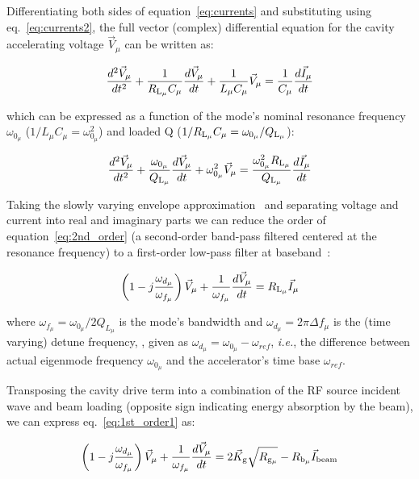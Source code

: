 \documentclass[a4paper,12pt]{article}
\begin{document}
Differentiating both sides of equation~\ref{eq:currents} and substituting using eq.~\ref{eq:currents2}, the full vector (complex) differential equation for the cavity accelerating voltage $\vec V_{\mu}$ can be written as:

\begin{equation}
  \frac{d^2\vec V_{\mu}}{dt^2} + \frac{1}{R_{\rm L_{\mu}}C_{\mu}}\frac{d\vec V_{\mu}}{dt} + \frac{1}{L_{\mu}C_{\mu}}\vec V_{\mu} = \frac{1}{C_{\mu}}\frac{d\vec I_{\mu}}{dt}
\end{equation}

\noindent which can be expressed as a function of the mode's nominal resonance frequency $\omega_{0_{\mu}}$ ($1/L_{\mu}C_{\mu}=\omega_{0_{\mu}}^2$) and loaded Q ($1/R_{\rm L_{\mu}}C_{\mu}=\omega_{0_{\mu}}/Q_{\rm L_{\mu}}$):
 
\begin{equation}
  \frac{d^2\vec V_{\mu}}{dt^2} + \frac{\omega_{0_{\mu}}}{Q_{\rm L_{\mu}}}\frac{d\vec V_{\mu}}{dt} + \omega_{0_{\mu}}^2 \vec V_{\mu} = \frac{\omega_{0_{\mu}}^2 R_{\rm L_{\mu}}}{Q_{\rm L_{\mu}}}\frac{d\vec I_{\mu}}{dt}
  \label{eq:2nd_order}
\end{equation}

Taking the slowly varying envelope approximation~\cite{ref:svea} and separating voltage and current into real and imaginary parts we can reduce the order of equation~\ref{eq:2nd_order} (a second-order band-pass filtered centered at the resonance frequency) to a first-order low-pass filter at baseband~\cite{ref:schilcher}:

\begin{equation}
  \left(1-j\frac{\omega_{d_{\mu}}}{\omega_{f_{\mu}}}\right)\vec V_{\mu} + \frac{1}{\omega_{f_{\mu}}}\frac{d\vec V_{\mu}}{dt} = R_{\rm L_{\mu}} \vec I_{\mu}
  \label{eq:1st_order1}
\end{equation}

\noindent where $\omega_{f_{\mu}}=\omega_{0_{\mu}}/2Q_{L_{\mu}}$ is the mode's bandwidth and $\omega_{d_{\mu}}=2\pi\Delta f_{\mu}$ is the (time varying) detune frequency,  , given as $\omega_{d_{\mu}}=\omega_{0_{\mu}}-\omega_{ref}$, {\it i.e.}, the difference between actual eigenmode frequency $\omega_{0_{\mu}}$ and the accelerator's time base $\omega_{ref}$.

Transposing the cavity drive term into a combination of the RF source incident wave and beam loading (opposite sign indicating energy absorption by the beam), we can express eq.~\ref{eq:1st_order1} as:

\begin{equation}
  \left(1-j\frac{\omega_{d_{\mu}}}{\omega_{f_{\mu}}}\right)\vec V_{\mu} + {\frac{1}{\omega_{f_{\mu}}}}\frac{d\vec V_{\mu}}{dt} =  2\vec K_{\rm g}\sqrt{R_{\rm g_{\mu}}} - R_{\rm b_{\mu}}\vec I_{\rm beam}
  \label{eq:1st_order2}
\end{equation}
\end{document}
